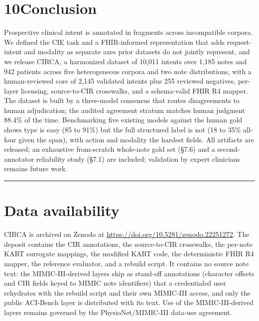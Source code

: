 \section{\texorpdfstring{{10}Conclusion}{10Conclusion}}\label{conclusion}

Prospective clinical intent is annotated in fragments across incompatible corpora. We defined the CIE task and a FHIR-informed representation that adds request-intent and modality as separate axes prior datasets do not jointly represent, and we release CIRCA, a harmonized dataset of 10,011 intents over 1,185 notes and 942 patients across five heterogeneous corpora and two note distributions, with a human-reviewed core of 2,145 validated intents plus 255 reviewed negatives, per-layer licensing, source-to-CIR crosswalks, and a schema-valid FHIR R4 mapper. The dataset is built by a three-model consensus that routes disagreements to human adjudication; the audited agreement stratum matches human judgment 88.4\% of the time. Benchmarking five existing models against the human gold shows type is easy (85 to 91\%) but the full structured label is not (18 to 35\% all-four given the span), with action and modality the hardest fields. All artifacts are released; an exhaustive from-scratch whole-note gold set (§7.6) and a second-annotator reliability study (§7.1) are included; validation by expert clinicians remains future work.

\begin{center}\rule{0.5\linewidth}{0.5pt}\end{center}

\section{\texorpdfstring{{}Data availability}{Data availability}}\label{data-availability}

CIRCA is archived on Zenodo at \url{https://doi.org/10.5281/zenodo.22251272}. The deposit contains the CIR annotations, the source-to-CIR crosswalks, the per-note KART surrogate mappings, the modified KART code, the deterministic FHIR R4 mapper, the reference evaluator, and a rebuild script. It contains no source note text: the MIMIC-III-derived layers ship as stand-off annotations (character offsets and CIR fields keyed to MIMIC note identifiers) that a credentialed user rehydrates with the rebuild script and their own MIMIC-III access, and only the public ACI-Bench layer is distributed with its text. Use of the MIMIC-III-derived layers remains governed by the PhysioNet/MIMIC-III data-use agreement.

